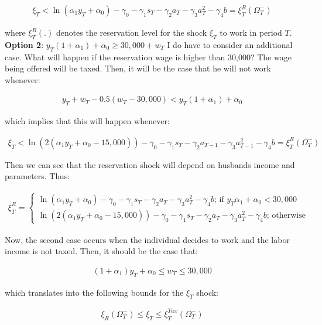 \documentclass[11pt]{article}
\begin{document}
\begin{align}\label{eq:nwork}
	\xi_T<\ln(\alpha_1y_T+\alpha_0)-\gamma_0-\gamma_1s_T-\gamma_2a_{T}-\gamma_3a_{T}^2-\gamma_4b=\xi_T^{R}(\Omega_T^-)
\end{align}

where $\xi_T^R(.)$ denotes the reservation level for the shock $\xi_T$ to work in period $T$. 
\\
\textbf{Option 2}:  $y_T(1+\alpha_1)+\alpha_0\geq 30,000+w_T$
I do have to consider an additional case. What will happen if the reservation wage is higher than 30,000? The wage being offered will be taxed. Then, it will be the case that he will not work whenever:


\begin{align}
	y_T+w_T-0.5(w_T-30,000)<y_T(1+\alpha_1)+\alpha_0
\end{align}

which implies that this will happen whenever:

\begin{align}
	\xi_T<\ln\left( 2(\alpha_1y_T+\alpha_0-15,000)\right)-\gamma_0-\gamma_1s_T-\gamma_2a_{T-1}-\gamma_3a_{T-1}^2-\gamma_4b=\xi_T^R(\Omega_T^-)
\end{align}

Then we can see that the reservation shock will depend on husbands income and parameters. Thus:

\begin{align}
	\xi_T^R=\begin{cases}
		\ln(\alpha_1y_T+\alpha_0)-\gamma_0-\gamma_1s_T-\gamma_2a_{T}-\gamma_3a_{T}^2-\gamma_4b  \text{;  if  } y_T\alpha_1+\alpha_0<30,000 \\
		\ln\left( 2(\alpha_1y_T+\alpha_0-15,000)\right)-\gamma_0-\gamma_1s_T-\gamma_2a_{T}-\gamma_3a_{T}^2-\gamma_4b \text{;   otherwise}
	\end{cases}
\end{align}

Now, the second case occurs when the individual decides to work and the labor income is not taxed. Then, it should be the case that:

\begin{align}
	(1+\alpha_1)y_T+\alpha_0\leq w_T\leq 30,000
\end{align}

which translates into the following bounds for the $\xi_T$ shock:

\begin{align}\label{eq:wtax}
	\xi_R(\Omega_T^-)\leq\xi_T\leq\xi_T^{Tax}(\Omega_T^-)
\end{align}
\end{document}
